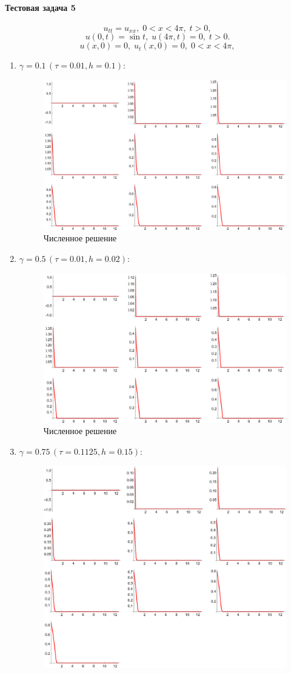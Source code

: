 \documentclass[12pt, a4paper]{article}
\begin{document}
\paragraph{Тестовая задача 5}
\[
u_{tt}=u_{xx},\;0<x<4\pi,\;t>0,
\]
\[
u(0,t)=\sin t,\;u(4\pi,t)=0,\;t>0.
\]
\[
u(x,0)=0,\; u_t(x,0)=0,\;0<x<4\pi,
\]
\begin{enumerate}
	\item $\gamma =0.1\,(\tau = 0.01 ,h =0.1)$:
	\begin{figure}[H]
		\centering
		\includegraphics[width=0.7\linewidth]{task3_0.1}
		\caption{Численное решение}
	\end{figure}
\newpage
	\item $\gamma =0.5\,(\tau = 0.01 ,h =0.02)$:
	\begin{figure}[H]
		\centering
		\includegraphics[width=0.7\linewidth]{task3_0.5}
		\caption{Численное решение}
	\end{figure}
	\item $\gamma =0.75\,(\tau = 0.1125 ,h =0.15)$:
	\begin{figure}[H]
		\centering
		\includegraphics[width=0.7\linewidth]{task3_0.75}

\end{figure}
\end{enumerate}
\end{document}
